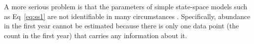 \documentclass[12pt]{article}
\begin{document}
A more serious problem %
is that the parameters of simple state-space models
such as Eq~\ref{eq:ss1} are not identifiable in many
circumstances \citep{polansky_etal:2009}. Specifically, abundance in
the first year cannot be estimated because there is only one data
point (the count in the first year) that carries any information about
it. 
\end{document}
